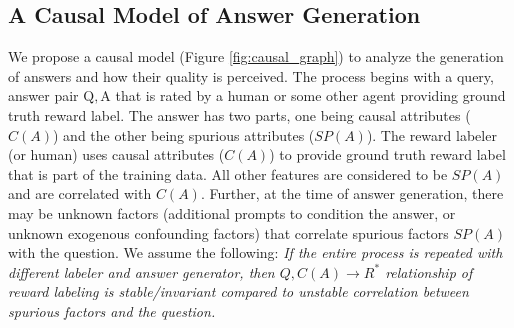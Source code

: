 


\subsection{A Causal Model of Answer Generation}
\label{subsec:causal_graph}



We propose a causal model (Figure \ref{fig:causal_graph}) to analyze the generation of answers and how their quality is perceived. The process begins with a query, answer pair $\mathrm{Q},\mathrm{A}$ that is rated by a human or some other agent providing ground truth reward label. {\color{blue} The answer has two parts, one being causal attributes ($C(A)$) and the other being spurious attributes ($SP(A)$). The reward labeler (or human) uses causal attributes ($C(A)$) to provide ground truth reward label that is part of the training data. All other features are considered to be $SP(A)$ and are correlated with $C(A)$. Further, at the time of answer generation, there may be unknown factors (additional prompts to condition the answer, or unknown exogenous confounding factors) that correlate spurious factors $SP(A)$ with the question. 
We assume the following: \textit{If the entire process is repeated with different labeler and answer generator, then $Q, C(A) \rightarrow R^{*}$ relationship of reward labeling  is stable/invariant compared to unstable correlation between spurious factors and the question.}}

